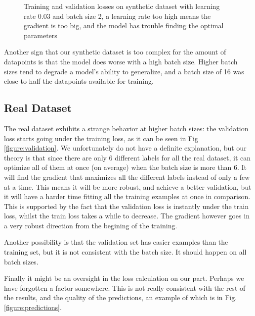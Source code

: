 \documentclass[10pt,conference]{IEEEtran}
\begin{document}
\begin{figure}[h]
\begin{minipage}[h]{0.23\textwidth}
    \caption{Training and validation losses on synthetic dataset with learning rate 0.03 and batch size 2, a learning rate too high means the gradient is too big, and the model has trouble finding the optimal parameters}
    \label{figure:highlr}
  \end{minipage}
\end{figure}

Another sign that our synthetic dataset is too complex for the amount of datapoints is that the model does worse with a high batch size. Higher batch sizes tend to degrade a model's ability to generalize, and a batch size of 16 was close to half the datapoints available for training.
\subsection{Real Dataset}
The real dataset exhibits a strange behavior at higher batch sizes: the validation loss starts going under the training loss, as it can be seen in Fig \ref{figure:validation}. We unfortunately do not have a definite explanation, but our theory is that since there are only 6 different labels for all the real dataset, it can optimize all of them at once (on average) when the batch size is more than 6. It will find the gradient that maximizes all the different labels instead of only a few at a time. This means it will be more robust, and achieve a better validation, but it will have a harder time fitting all the training examples at once in comparison. This is supported by the fact that the validation loss is instantly under the train loss, whilst the train loss takes a while to decrease. The gradient however goes in a very robust direction from the begining of the training.\par
Another possibility is that the validation set has easier examples than the training set, but it is not consistent with the batch size. It should happen on all batch sizes.\par
Finally it might be an oversight in the loss calculation on our part. Perhaps we have forgotten a factor somewhere. This is not really consistent with the rest of the results, and the quality of the predictions, an example of which is in Fig. \ref{figure:predictions}.
\end{document}
